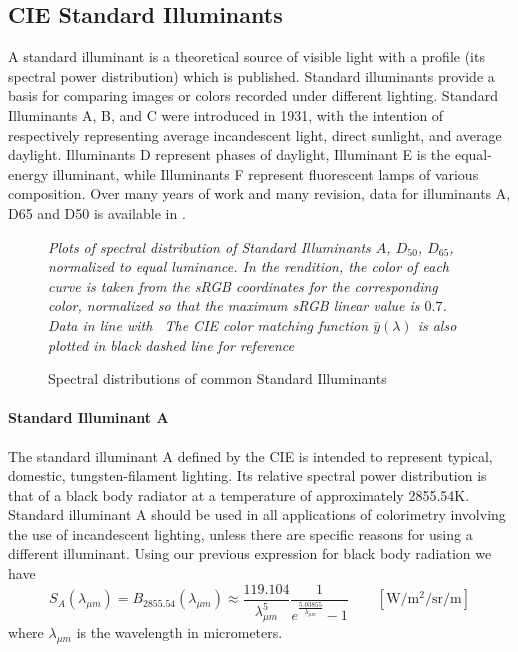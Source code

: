 \subsection{CIE Standard Illuminants}

A standard illuminant is a theoretical source of visible light with a profile
(its spectral power distribution) which is published. 
Standard illuminants provide a basis for comparing images or colors recorded 
under different lighting. Standard Illuminants A, B, and C were
introduced in 1931, with the intention of respectively representing average
incandescent light, direct sunlight, and average daylight. 
Illuminants D represent phases of daylight, Illuminant E is the equal-energy 
illuminant, while Illuminants F represent fluorescent lamps of various
composition. 
Over many years of work and many revision, data for illuminants 
A, D65 and D50 is available in \cite{isocie:11664-2:2022}.

\begin{figure}
{
\small
\centering
{}
\caption{Spectral distributions of common Standard Illuminants}
\label{fig:illumspectra}
}
\vskip 1mm
{\footnotesize\it Plots of spectral distribution of
Standard Illuminants $A$, $D_{50}$, $D_{65}$, 
normalized to equal luminance.
In the rendition, the color of each curve is taken from the
sRGB coordinates for the corresponding color,
normalized so that the maximum sRGB linear value is $0.7$.
Data in line with~\cite{isocie:11664-2:2022}
The CIE color matching function $\bar y (\lambda)$ is also plotted in
black dashed line for reference}
\end{figure}

\paragraph{Standard Illuminant A}

The standard illuminant A defined by the \gls{CIE} is intended to
represent typical, domestic, tungsten-filament lighting.
Its relative spectral power distribution is that of a black body radiator at a
temperature of approximately \num{2855.54}\unit{\kelvin}.
Standard illuminant A should be used in all applications of colorimetry
involving the use of incandescent lighting, unless there are specific reasons
for
using a different illuminant. Using our previous expression for black body radiation we have
\begin{equation}
S_{A}(\lambda_{\mu m}) = B_{2855.54}(\lambda_{\mu m}) \approx
\frac{119.104}{\lambda_{\mu m}^5} \frac 1{e^{\frac{5.03855}{\lambda_{\mu m}}}-1}
\qquad \left[\unit{\watt\per\square\meter\per\steradian\per\meter}\right]
\end{equation}
where $\lambda_{\mu m}$ is the wavelength in micrometers.

